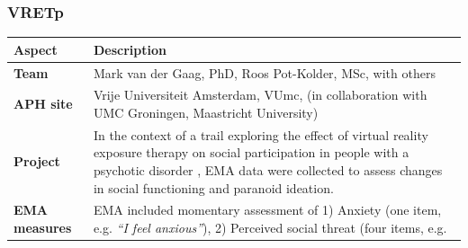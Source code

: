 \documentclass[]{book}
\begin{document}
\subsubsection{VRETp}\label{vretp}

 

\begin{longtable}[]{@{}ll@{}}
\toprule
\begin{minipage}[b]{0.25\columnwidth}\raggedright\strut
\textbf{Aspect}\strut
\end{minipage} & \begin{minipage}[b]{0.69\columnwidth}\raggedright\strut
\textbf{Description}\strut
\end{minipage}\tabularnewline
\midrule
\endhead
\begin{minipage}[t]{0.25\columnwidth}\raggedright\strut
\textbf{Team}\strut
\end{minipage} & \begin{minipage}[t]{0.69\columnwidth}\raggedright\strut
Mark van der Gaag, PhD, Roos Pot-Kolder, MSc, with others\strut
\end{minipage}\tabularnewline
\begin{minipage}[t]{0.25\columnwidth}\raggedright\strut
\textbf{APH site}\strut
\end{minipage} & \begin{minipage}[t]{0.69\columnwidth}\raggedright\strut
Vrije Universiteit Amsterdam, VUmc, (in collaboration with UMC
Groningen, Maastricht University)\strut
\end{minipage}\tabularnewline
\begin{minipage}[t]{0.25\columnwidth}\raggedright\strut
\textbf{Project}\strut
\end{minipage} & \begin{minipage}[t]{0.69\columnwidth}\raggedright\strut
In the context of a trail exploring the effect of virtual reality
exposure therapy on social participation in people with a psychotic
disorder \citep[VRETp; n = 116,][]{pot2016}, EMA data were collected to
assess changes in social functioning and paranoid ideation.\strut
\end{minipage}\tabularnewline
\begin{minipage}[t]{0.25\columnwidth}\raggedright\strut
\textbf{EMA measures}\strut
\end{minipage} & \begin{minipage}[t]{0.69\columnwidth}\raggedright\strut
EMA included momentary assessment of 1) Anxiety (one item, e.g.
\emph{``I feel anxious''}), 2) Perceived social threat (four items, e.g.

\end{minipage}
\end{longtable}
\end{document}
